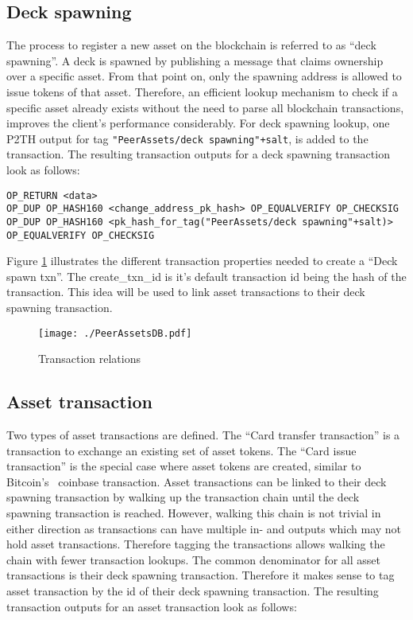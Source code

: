 \documentclass[a4paper,10pt]{article}
\begin{document}
\subsection{Deck spawning}
The process to register a new asset on the blockchain is referred to as ``deck spawning''.
A deck is spawned by publishing a message that claims ownership over a specific asset. From that point on, only the spawning address is allowed to issue tokens of that asset.
Therefore, an efficient lookup mechanism to check if a specific asset already exists without the need to parse all blockchain transactions, improves the client's performance considerably.
For deck spawning lookup, one P2TH output for tag \verb|"PeerAssets/deck spawning"+salt|, is added to the transaction.
The resulting transaction outputs for a deck spawning transaction look as follows:

\begin{scriptsize}\begin{verbatim}
OP_RETURN <data>
OP_DUP OP_HASH160 <change_address_pk_hash> OP_EQUALVERIFY OP_CHECKSIG
OP_DUP OP_HASH160 <pk_hash_for_tag("PeerAssets/deck spawning"+salt)> OP_EQUALVERIFY OP_CHECKSIG
\end{verbatim}\end{scriptsize}

Figure \ref{fig:txn_relations} illustrates the different transaction properties needed to create a ``Deck spawn txn''.
The create\_txn\_id is it's default transaction id being the hash of the transaction.
This idea will be used to link asset transactions to their deck spawning transaction.

\begin{figure}[h]
 \centering
 \texttt{[image: ./PeerAssetsDB.pdf]}
 \caption{Transaction relations}
 \label{fig:txn_relations}
\end{figure}

\subsection{Asset transaction}
Two types of asset transactions are defined.
The ``Card transfer transaction'' is a transaction to exchange an existing set of asset tokens.
The ``Card issue transaction'' is the special case where asset tokens are created, similar to Bitcoin's~\cite{Nak08} coinbase transaction.
Asset transactions can be linked to their deck spawning transaction by walking up the transaction chain until the deck spawning transaction is reached.
However, walking this chain is not trivial in either direction as transactions can have multiple in- and outputs which may not hold asset transactions.
Therefore tagging the transactions allows walking the chain with fewer transaction lookups.
The common denominator for all asset transactions is their deck spawning transaction.
Therefore it makes sense to tag asset transaction by the id of their deck spawning transaction.
The resulting transaction outputs for an asset transaction look as follows:
\end{document}
